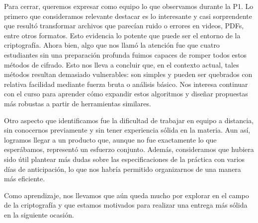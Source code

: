 Para cerrar, queremos expresar como equipo lo que observamos durante la P1. Lo primero que consideramos
relevante destacar es lo interesante y casi sorprendente que resultó transformar archivos que parecían
ruido o errores en videos, PDFs, entre otros formatos. Esto evidencia lo potente que puede ser el entorno
de la criptografía. Ahora bien, algo que nos llamó la atención fue que cuatro estudiantes sin una
preparación profunda fuimos capaces de romper todos estos métodos de cifrado. Esto nos lleva a concluir
que, en el contexto actual, tales métodos resultan demasiado vulnerables: son simples y pueden ser
quebrados con relativa facilidad mediante fuerza bruta o análisis básico. Nos interesa continuar con el
curso para aprender cómo expandir estos algoritmos y diseñar propuestas más robustas a partir de
herramientas similares. \vspace{.3cm}

Otro aspecto que identificamos fue la dificultad de trabajar en equipo a distancia, sin conocernos
previamente y sin tener experiencia sólida en la materia. Aun así, logramos llegar a un producto que,
aunque no fue exactamente lo que esperábamos, representó un esfuerzo conjunto. Además, consideramos que
hubiera sido útil plantear más dudas sobre las especificaciones de la práctica con varios días de
anticipación, lo que nos habría permitido organizarnos de una manera más eficiente. \vspace{.3cm}

Como aprendizaje, nos llevamos que aún queda mucho por explorar en el campo de la criptografía y que
estamos motivados para realizar una entrega más sólida en la siguiente ocasión.
